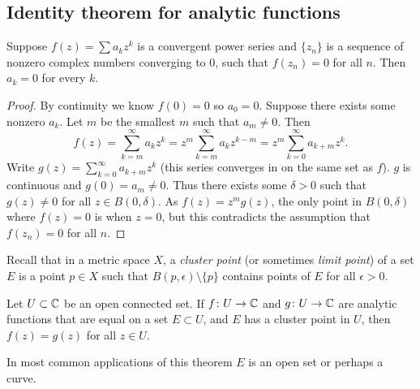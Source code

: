 \subsection{Identity theorem for analytic functions}

\begin{lemma}
Suppose $f(z) = \sum a_k z^k$ is a convergent power series and
$\{ z_n \}$ is a sequence of nonzero complex numbers converging to 0,
such that $f(z_n) = 0$ for all $n$.  Then $a_k = 0$ for every $k$.
\end{lemma}

\begin{proof}
By continuity we know $f(0) = 0$ so $a_0 = 0$.
Suppose there exists some nonzero $a_k$.
Let $m$ be the smallest $m$ such that $a_m \not= 0$.  Then
\begin{equation*}
f(z) = \sum_{k=m}^\infty a_k z^k = 
z^m \sum_{k=m}^\infty a_k z^{k-m} =
z^m \sum_{k=0}^\infty a_{k+m} z^{k} .
\end{equation*}
Write $g(z) = \sum_{k=0}^\infty a_{k+m} z^{k}$ (this series converges in
on the same set as $f$).  $g$ is continuous and $g(0) = a_m \not= 0$.  Thus
there exists some $\delta > 0$ such that $g(z) \not= 0$ for all $z \in
B(0,\delta)$.  As $f(z) = z^m g(z)$, the only point in $B(0,\delta)$ where
$f(z) = 0$ is when $z=0$, but this contradicts the assumption
that $f(z_n) = 0$ for all $n$.
\end{proof}

Recall that in a metric space $X$, a \emph{cluster point}
(or sometimes \emph{limit point}) of a set
$E$ is a point $p \in X$ such that
$B(p,\epsilon) \setminus \{ p \}$ contains points of $E$
for all $\epsilon > 0$.

\begin{thm} \label{thm:identityanalytic}
Let $U \subset {\mathbb{C}}$ be an open connected set.  If $f \colon U \to {\mathbb{C}}$
and $g \colon U \to {\mathbb{C}}$ are analytic functions that are
equal on a set $E \subset U$, and $E$ has a cluster point
in $U$, then $f(z) = g(z)$ for all $z \in U$.
\end{thm}

In most common applications of this theorem $E$ is an open set or perhaps a curve.

